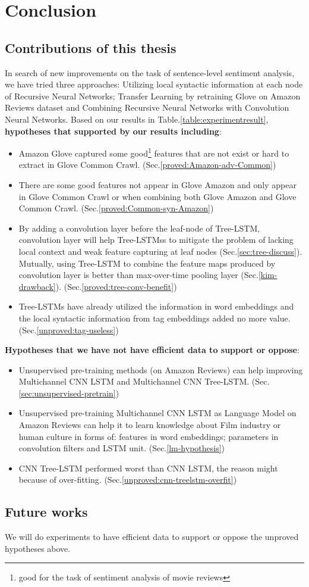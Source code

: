\hypertarget{chap:conclude}{\chapter{Conclusion}}\label{conclusion}
\section{Contributions of this thesis}
In search of new improvements on the task of sentence-level sentiment analysis, we have tried three approaches: Utilizing local syntactic information at each node of Recursive Neural Networks; Transfer Learning by retraining Glove on Amazon Reviews dataset and Combining Recursive Neural Networks with Convolution Neural Networks.
Based on our results in Table.\ref{table:experimentresult}, \textbf{hypotheses that supported by our results including}:
\begin{itemize}
\item Amazon Glove captured some good\footnote{good for the task of sentiment analysis of movie reviews} features that are not exist or hard to extract in Glove Common Crawl. (Sec.\ref{proved:Amazon-adv-Common})

\item There are some good features not appear in Glove Amazon and only appear in Glove Common Crawl or when combining both Glove Amazon and Glove Common Crawl. (Sec.\ref{proved:Common-syn-Amazon})

\item By adding a convolution layer before the leaf-node of Tree-LSTM, convolution layer will help Tree-LSTMss to mitigate the problem of lacking local context and weak feature capturing at leaf nodes (Sec.\ref{sec:tree-discuss}).
Mutually, using Tree-LSTM to combine the feature maps produced by convolution layer is better than max-over-time pooling layer (Sec.\ref{kim-drawback}). (Sec.\ref{proved:tree-conv-benefit})

\item  Tree-LSTMs have already utilized the information in word embeddings and the local syntactic information from tag embeddings added no more value. (Sec.\ref{unproved:tag-useless})
\end{itemize}
\bigbreak
\label{unproved-hypo}
\textbf{Hypotheses that we have not have efficient data to support or oppose}:
\begin{itemize}
\item Unsupervised pre-training methods (on Amazon Reviews) can help improving Multichannel CNN LSTM and Multichannel CNN Tree-LSTM. (Sec.\ref{sec:unsupervised-pretrain})

\item  Unsupervised pre-training Multichannel CNN LSTM as Language Model on Amazon Reviews can help it to learn knowledge about Film industry or human culture in forms of: features in word embeddings; parameters in convolution filters and LSTM unit. (Sec.\ref{lm-hypothesis})

\item CNN Tree-LSTM performed worst than CNN LSTM, the reason might because of over-fitting. (Sec.\ref{unproved:cnn-treelstm-overfit})
\end{itemize}

\section{Future works}
We will do experiments to have efficient data to support or oppose the unproved hypotheses above.
